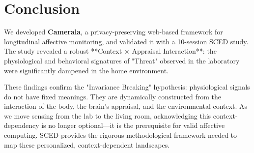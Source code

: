 \section{Conclusion}

We developed \textbf{Camerala}, a privacy-preserving web-based framework for longitudinal affective monitoring, and validated it with a 10-session SCED study. The study revealed a robust **Context $\times$ Appraisal Interaction**: the physiological and behavioral signatures of "Threat" observed in the laboratory were significantly dampened in the home environment.

These findings confirm the "Invariance Breaking" hypothesis: physiological signals do not have fixed meanings. They are dynamically constructed from the interaction of the body, the brain's appraisal, and the environmental context. As we move sensing from the lab to the living room, acknowledging this context-dependency is no longer optional—it is the prerequisite for valid affective computing. SCED provides the rigorous methodological framework needed to map these personalized, context-dependent landscapes.
